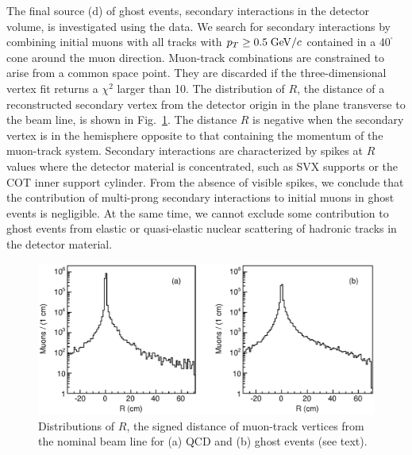 \documentclass[aps,prd,preprint,floatfix,nofootinbib,superscriptaddress,showpacs,amssymb]{revtex4}
\def\deg{^\circ}
\begin{document}
 The final source (d) of ghost events, secondary interactions in the
 detector volume, is investigated using the data. We search for
 secondary interactions by combining initial muons with all  tracks
 with $p_T\geq 0.5 \; {\rm GeV/}c$ contained in a 40$^{\deg}$ cone around 
 the muon direction. Muon-track combinations are constrained to arise
 from a common space point. They are discarded if the three-dimensional
 vertex fit returns a $\chi^2$ larger than 10.
 The distribution of $R$, the distance of a reconstructed secondary 
 vertex from the detector origin in the plane transverse to the beam
 line, is shown in Fig.~\ref{fig:fig_sint}. The distance $R$ is 
 negative when the secondary vertex is  in the hemisphere opposite to
 that containing the momentum of the muon-track system. Secondary
 interactions are characterized by spikes at $R$ values where the
 detector material is concentrated, such as SVX supports or the COT
 inner support cylinder. From the absence of visible spikes, we conclude 
 that the contribution of multi-prong secondary interactions to initial 
 muons in ghost events is negligible. At the same time, we cannot exclude
 some contribution to ghost events from elastic or quasi-elastic nuclear
 scattering of hadronic tracks in the detector material.
 \begin{figure}[]
 \begin{center}
 \vspace{-0.2in}
 \leavevmode
 \includegraphics*[width=\textwidth]{rv_mutrk_comb.eps}
 \caption[]{Distributions of $R$, the signed distance of muon-track
            vertices from the nominal beam line for (a) QCD and
            (b) ghost events (see text).}
 \label{fig:fig_sint}
 \end{center}
 \end{figure}
\end{document}

